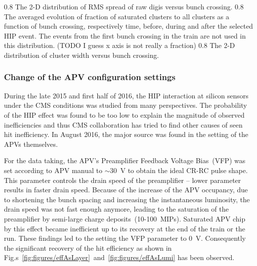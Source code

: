                  {0.8}       %
                 {The 2-D distribution of RMS spread of raw digis versus bunch crossing. } %
                 {0.8}       %
                 {The averaged evolution of fraction of saturated clusters to all clusters as a function of bunch crossing, respectively time, before, during and after the selected HIP event.  The events from the first bunch crossing in the train are not used in this distribution. (TODO I guess x axis is not really a fraction) } %
                 {0.8}       %
                 {The 2-D distribution of cluster width versus bunch crossing. } %


\subsubsection{Change of the APV configuration settings}

During the late 2015 and first half of 2016, the HIP interaction at silicon sensors under the CMS conditions was studied from many perspectives. The probability of the HIP effect was found to be too low to explain the magnitude of observed inefficiencies and thus CMS collaboration has tried to find other causes of seen hit inefficiency. In August 2016, the major source was found in the setting of the APVs themselves.

For the data taking, the APV's Preamplifier Feedback Voltage Bias~(VFP) was set according to APV manual to $\sim$30~V to obtain the ideal CR-RC pulse shape. This parameter controls the drain speed of the preamplifier -- lower parameter results in faster drain speed. Because of the increase of the APV occupancy, due to shortening the bunch spacing and increasing the instantaneous luminosity, the drain speed was not fast enough anymore, leading to the saturation of the preamplifier by semi-large charge deposits~(10-100~MIPs). Saturated APV chip by this effect became inefficient up to its recovery at the end of the train or the run. These findings led to the setting the VFP parameter to 0~V. Consequently the significant recovery of the hit efficiency as shown in Fig.s~\ref{fig:figures/effAsLayer}~and~\ref{fig:figures/effAsLumi} has been observed.



